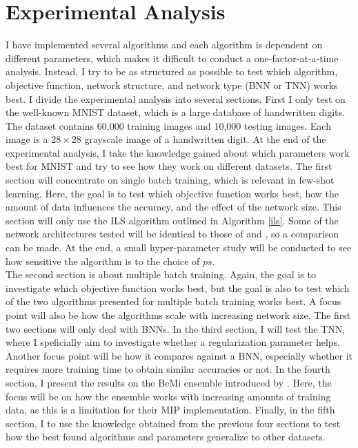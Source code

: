 \section{Experimental Analysis}

I have implemented several algorithms and each algorithm is dependent on different parameters, which makes it difficult to conduct a one-factor-at-a-time analysis. Instead, I try to be as structured as possible to test which algorithm, objective function, network structure, and network type (BNN or TNN) works best. 
I divide the experimental analysis into several sections. First I only test on the well-known MNIST dataset, which is a large database of handwritten digits. The dataset contains 60,000 training images and 10,000 testing images. Each image is a $28 \times 28$ grayscale image of a handwritten digit. At the end of the experimental analysis, I take the knowledge gained about which parameters work best for MNIST and try to see how they work on different datasets. The first section will concentrate on single batch training, which is relevant in few-shot learning. Here, the goal is to test which objective function works best, how the amount of data influences the accuracy, and the effect of the network size. This section will only use the ILS algorithm outlined in Algorithm \ref{ils}. Some of the network architectures tested will be identical to those of \cite{icarte2019} and \cite{thorbjarnason2023}, so a comparison can be made. At the end, a small hyper-parameter study will be conducted to see how sensitive the algorithm is to the choice of $ps$. \\

\noindent The second section is about multiple batch training. Again, the goal is to investigate which objective function works best, but the goal is also to test which of the two algorithms presented for multiple batch training works best. A focus point will also be how the algorithms scale with increasing network size. 
The first two sections will only deal with BNNs. In the third section, I will test the TNN, where I speficially aim to investigate whether a regularization parameter helps. Another focus point will be how it compares against a BNN, especially whether it requires more training time to obtain similar accuracies or not. 
In the fourth section, I present the results on the BeMi ensemble introduced by \cite{ambrogio2023}. Here, the focus will be on how the ensemble works with increasing amounts of training data, as this is a limitation for their MIP implementation. Finally, in the fifth section, I to use the knowledge obtained from the previous four sections to test how the best found algorithms and parameters generalize to other datasets. \\

